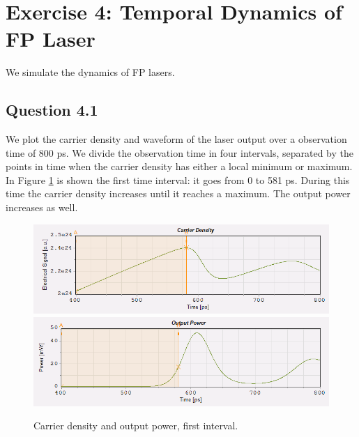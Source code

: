 \documentclass[a4paper,10pt]{report}
\begin{document}
\newpage
\section*{Exercise 4: Temporal Dynamics of FP Laser}
We simulate the dynamics of FP lasers.

\subsection*{Question 4.1}
We plot the carrier density and waveform of the laser output over a observation time of 800 ps.
We divide the observation time in four intervals, separated by the points in time when the carrier density has either a local minimum or maximum.
In Figure \ref{4_1} is shown the first time interval: it goes from 0 to 581 ps. During this time the carrier density increases until it reaches
a maximum. The output power increases as well.
\newpage

\begin{figure}[!ht]
  \centering
  \includegraphics[width=12cm]{4_1cd.png}\\
  \includegraphics[width=12cm]{4_1pw.png}\\
  \caption{Carrier density and output power, first interval.}
  \label{4_1}
\end{figure}
\end{document}
